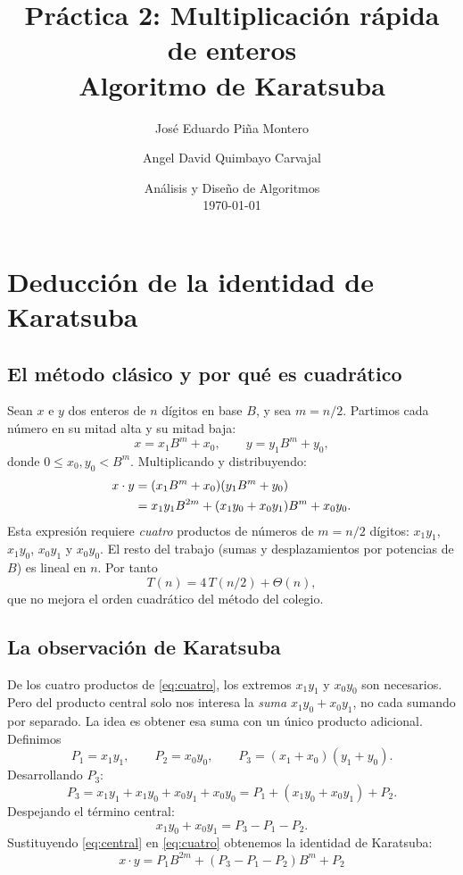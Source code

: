 \documentclass[11pt,a4paper]{article}
\title{Práctica 2: Multiplicación rápida de enteros\\
Algoritmo de Karatsuba}
\author{José Eduardo Piña Montero \and Angel David Quimbayo Carvajal}
\date{Análisis y Diseño de Algoritmos \\ \today}
\begin{document}
\maketitle

\section{Deducción de la identidad de Karatsuba}

\subsection{El método clásico y por qué es cuadrático}

Sean $x$ e $y$ dos enteros de $n$ dígitos en base $B$, y sea $m = n/2$.
Partimos cada número en su mitad alta y su mitad baja:
\[
  x = x_1 B^m + x_0, \qquad y = y_1 B^m + y_0,
\]
donde $0 \le x_0, y_0 < B^m$. Multiplicando y distribuyendo:
\begin{align}
  x \cdot y & = (x_1 B^m + x_0)(y_1 B^m + y_0) \notag                                 \\
            & = x_1 y_1 B^{2m} + (x_1 y_0 + x_0 y_1) B^m + x_0 y_0. \label{eq:cuatro}
\end{align}
Esta expresión requiere \emph{cuatro} productos de números de $m = n/2$ dígitos: $x_1y_1$, $x_1y_0$, $x_0y_1$ y $x_0y_0$. El resto del trabajo (sumas y desplazamientos por potencias de $B$) es lineal en $n$. Por tanto
\[
  T(n) = 4\,T(n/2) + \Theta(n),
\]
que no mejora el orden cuadrático del método del colegio.

\subsection{La observación de Karatsuba}

De los cuatro productos de \eqref{eq:cuatro}, los extremos $x_1y_1$ y $x_0y_0$
son necesarios. Pero del producto central solo nos interesa la \emph{suma}
$x_1y_0 + x_0y_1$, no cada sumando por separado. La idea es obtener esa suma
con un único producto adicional. Definimos
\[
  P_1 = x_1 y_1, \qquad P_2 = x_0 y_0, \qquad P_3 = (x_1 + x_0)(y_1 + y_0).
\]
Desarrollando $P_3$:
\[
  P_3 = x_1 y_1 + x_1 y_0 + x_0 y_1 + x_0 y_0 = P_1 + (x_1 y_0 + x_0 y_1) + P_2 .
\]
Despejando el término central:
\begin{equation}
  x_1 y_0 + x_0 y_1 = P_3 - P_1 - P_2. \label{eq:central}
\end{equation}
Sustituyendo \eqref{eq:central} en \eqref{eq:cuatro} obtenemos la identidad de Karatsuba:
\begin{equation}
  \boxed{\,x \cdot y = P_1 B^{2m} + (P_3 - P_1 - P_2) B^m + P_2\,} \label{eq:karatsuba}
\end{equation}
\end{document}
